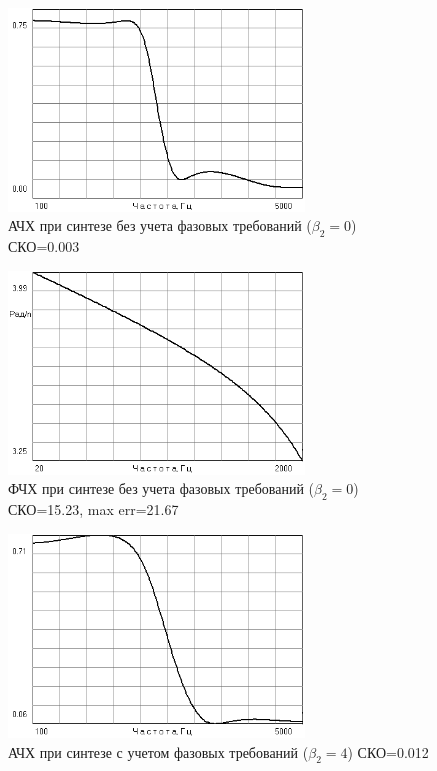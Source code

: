 \documentclass[a4paper,14pt]{extarticle}
\begin{document}
\begin{figure}[H]
  \centering
  \includegraphics[width=0.7\textwidth]{Z4_FN4/gain_0.png}
  \caption{АЧХ при синтезе без учета фазовых требований ($\beta_2=0$) СКО=0.003}
  \label{fig:}
\end{figure}
\begin{figure}[H]
  \centering
  \includegraphics[width=0.7\textwidth]{Z4_FN4/phase_0.png}
  \caption{ФЧХ при синтезе без учета фазовых требований ($\beta_2=0$) СКО=15.23, max err=21.67}
  \label{fig:}
\end{figure}
\begin{figure}[H]
  \centering
  \includegraphics[width=0.7\textwidth]{Z4_FN4/gain_4.png}
  \caption{АЧХ при синтезе с учетом фазовых требований ($\beta_2=4$) СКО=0.012}
  \label{fig:}
\end{figure}
\end{document}
